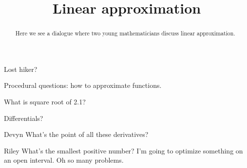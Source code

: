 \documentclass{ximera}
\title[Break-Ground:]{Linear approximation}
\begin{document}
\begin{abstract}
Here we see a dialogue where two young mathematicians discuss linear approximation.
\end{abstract}
\maketitle

Lost hiker?

Procedural questions: how to approximate functions.

What is square root of 2.1?

Differentials?

\begin{dialogue}
\item[Devyn] 
What's the point of all these derivatives?
\item[Riley]
What's the smallest positive number?
I'm going to optimize something on an open interval.  Oh so many problems.
\end{dialogue}


\end{document}
